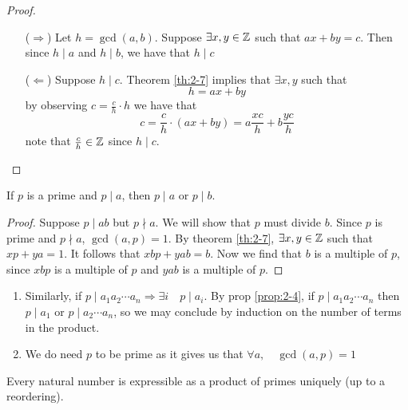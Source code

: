 \documentclass{article}
\begin{document}
\begin{proof}\leavevmode
    \begin{enumerate}
        \item[($\Rightarrow$)] Let $h = \gcd(a, b)$. Suppose $\exists x, y \in \mathbb{Z}$ such that $ax + by = c$. Then since $h \mid a$ and $h \mid b$, we have that $h \mid c$ 
        \item[($\Leftarrow$)] Suppose $h \mid c$. Theorem \ref{th:2-7} implies that $\exists x, y$ such that
        \[
            h = ax + by
        \]
        by observing $c = \frac{c}{h} \cdot h$ we have that
        \[
            c = \frac{c}{h} \cdot (ax + by) = a \frac{xc}{h} + b \frac{yc}{h} 
        \]
        note that $\frac{c}{h} \in \mathbb{Z}$ since $h \mid c$.
    \end{enumerate}
\end{proof}

\begin{prop}
    If $p$ is a prime and $p \mid a$, then $p \mid a$ or $p \mid b$.
\end{prop}

\begin{proof}
    Suppose $p \mid ab$ but $p \nmid a$. We will show that $p$ must divide $b$. 
    Since $p$ is prime and $p \nmid a$, $\gcd(a, p) = 1$. By theorem \ref{th:2-7}, $\exists x, y \in \mathbb{Z}$ such that $xp + ya = 1$.
    It follows that $xbp + yab = b$. Now we find that $b$ is a multiple of $p$, since $xbp$ is a multiple of $p$ and $yab$ is a multiple of $p$.
\end{proof}

\begin{remark}
    \begin{enumerate}
        \item Similarly, if $p \mid a_1a_2\cdots a_n \Rightarrow \exists i \quad p \mid a_i$. By prop \ref{prop:2-4}, if $p \mid a_1a_2\cdots a_n$ then $p \mid a_1$ or $p \mid a_2\cdots a_n$, so we may conclude by induction on the number of terms in the product.
        \item We do need $p$ to be prime as it gives us that $\forall a, \quad \gcd(a, p) = 1$
    \end{enumerate}
\end{remark}

\begin{nthm}
    Every natural number is expressible as a product of primes uniquely (up to a reordering).
\end{nthm}
\end{document}
